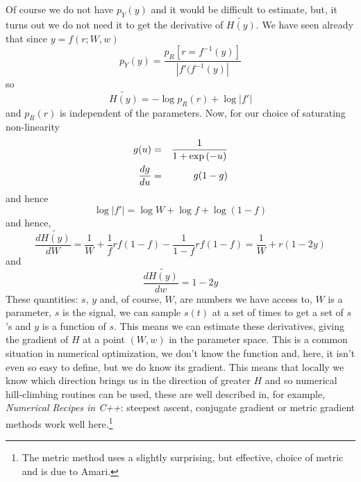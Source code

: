 \documentclass[12pt]{article}
\begin{document}
Of course we do not have $p_Y(y)$ and it would be difficult to
estimate, but, it turns out we do not need it to get the derivative of
$\tilde{H(y)}$. We have seen already that since $y=f(r;W,w)$
\begin{equation}
p_Y(y)=\frac{p_R[r=f^{-1}(y)]}{|f'(f^{-1}(y)|}
\end{equation}
so
\begin{equation}
\tilde{H(y)}=-\log{p_R(r)}+\log{|f'|}
\end{equation}
and $p_R(r)$ is independent of the parameters. Now, for our choice of saturating non-linearity
\begin{eqnarray}
g(u)&=&\frac{1}{1+\exp{(-u)}}\cr
\frac{dg}{du}&=&g(1-g)
\end{eqnarray}
and hence
\begin{equation}
\log{|f'|}=\log{W}+\log{f}+\log{(1-f)}
\end{equation}
and hence, 
\begin{equation}
\frac{d\tilde{H(y)}}{dW}=\frac{1}{W}+\frac{1}{f}rf(1-f)-\frac{1}{1-f}rf(1-f)=\frac{1}{W}+r(1-2y)
\end{equation}
and 
\begin{equation}
\frac{d\tilde{H(y)}}{dw}=1-2y
\end{equation}
These quantities: $s$, $y$ and, of course, $W$, are numbers we have
access to, $W$ is a parameter, $s$ is the signal, we can sample $s(t)$
at a set of times to get a set of $s$'s and $y$ is a function of
$s$. This means we can estimate these derivatives, giving the gradient
of $H$ at a point $(W,w)$ in the parameter space. This is a common
situation in numerical optimization, we don't know the function and,
here, it isn't even so easy to define, but we do know its
gradient. This means that locally we know which direction brings us in
the direction of greater $H$ and so numerical hill-climbing routines
can be used, these are well described in, for example, {\sl Numerical
  Recipes in C++}: steepest ascent, conjugate gradient or metric
gradient methods work well here.\footnote{The metric method uses a
  slightly surprising, but effective, choice of metric and is due to
  Amari.}
\end{document}
